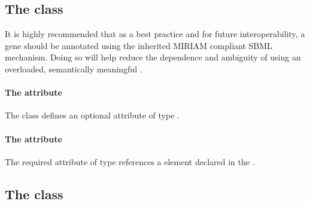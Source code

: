 \subsection{The \FBC {} class}
\label{geneproductref-class}


It is highly recommended that as a best practice and for future interoperability, a gene should be annotated using the inherited MIRIAM compliant SBML \Annotation mechanism. Doing so will help reduce the dependence and ambiguity of using an overloaded, semantically meaningful .

\paragraph{The  attribute}
The \GeneProteinAssociation class defines an optional attribute  of type .


\paragraph{The  attribute}
The required  attribute of type  references 
a \GeneProduct element declared in the \ListOfGeneProducts. 
\pagebreak
\subsection{The \FBC {} class}
\label{and-class}

